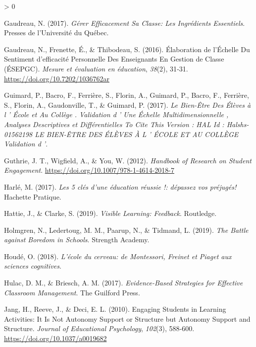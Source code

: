 \documentclass[
  french,
]{article}
\newlength{\cslhangindent}
\newenvironment{CSLReferences}[2] %
 {%
  \setlength{\parindent}{0pt}
  \ifodd #1 \everypar{\setlength{\hangindent}{\cslhangindent}}\ignorespaces\fi
  \ifnum #2 > 0
  \setlength{\parskip}{#2\baselineskip}
  \fi
 }%
 {}
\begin{document}
\begin{CSLReferences}{1}{0}
\leavevmode\hypertarget{ref-gaudreau2017}{}%
Gaudreau, N. (2017). \emph{Gérer Efficacement Sa Classe: Les Ingrédients Essentiels}. {Presses de l'Université du Québec}.

\leavevmode\hypertarget{ref-gaudreau2016}{}%
Gaudreau, N., Frenette, É., \& Thibodeau, S. (2016). Élaboration de l'{Échelle} Du Sentiment d'efficacité Personnelle Des Enseignants En Gestion de Classe ({ÉSEPGC}). \emph{Mesure et évaluation en éducation}, \emph{38}(2), 31‑31. \url{https://doi.org/10.7202/1036762ar}

\leavevmode\hypertarget{ref-guimard2017}{}%
Guimard, P., Bacro, F., Ferrière, S., Florin, A., Guimard, P., Bacro, F., Ferrière, S., Florin, A., Gaudonville, T., \& Guimard, P. (2017). \emph{Le Bien-Être Des Élèves à l ' École et Au Collège . {Validation} d ' Une Échelle Multidimensionnelle , Analyses Descriptives et Différentielles {To} Cite This Version : {HAL Id} : Halshs-01562198 {LE BIEN}-{ÊTRE DES ÉLÈVES À L} ' {ÉCOLE ET AU COLLÈGE Validation} d '}.

\leavevmode\hypertarget{ref-guthrie2012}{}%
Guthrie, J. T., Wigfield, A., \& You, W. (2012). \emph{Handbook of {Research} on {Student Engagement}}. \url{https://doi.org/10.1007/978-1-4614-2018-7}

\leavevmode\hypertarget{ref-harle2017}{}%
Harlé, M. (2017). \emph{{Les 5 clés d'une éducation réussie !: dépassez vos préjugés!}} {Hachette Pratique}.

\leavevmode\hypertarget{ref-hattie2019}{}%
Hattie, J., \& Clarke, S. (2019). \emph{Visible Learning: Feedback}. {Routledge}.

\leavevmode\hypertarget{ref-holmgren2019}{}%
Holmgren, N., Ledertoug, M. M., Paarup, N., \& Tidmand, L. (2019). \emph{The {Battle} against {Boredom} in Schools}. {Strength Academy}.

\leavevmode\hypertarget{ref-houde2018a}{}%
Houdé, O. (2018). \emph{{L'école du cerveau: de Montessori, Freinet et Piaget aux sciences cognitives}}.

\leavevmode\hypertarget{ref-hulac2017a}{}%
Hulac, D. M., \& Briesch, A. M. (2017). \emph{Evidence-Based Strategies for Effective Classroom Management}. {The Guilford Press}.

\leavevmode\hypertarget{ref-jang2010}{}%
Jang, H., Reeve, J., \& Deci, E. L. (2010). Engaging {Students} in {Learning Activities}: {It} Is {Not Autonomy Support} or {Structure} but {Autonomy Support} and {Structure}. \emph{Journal of Educational Psychology}, \emph{102}(3), 588‑600. \url{https://doi.org/10.1037/a0019682}


\end{CSLReferences}
\end{document}
